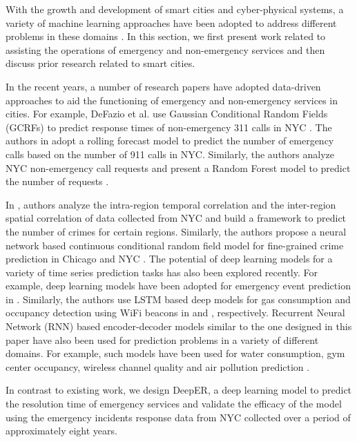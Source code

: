 
With the growth and development of smart cities and cyber-physical systems, a variety of machine learning approaches have been adopted to address different problems in these domains \cite{Fox, 6894591, AROMA, Guan, AAAI1816607,Varamin}. In this section, we first present work related to assisting the operations of emergency and non-emergency  services and then discuss  prior research related to smart cities.

In the recent years, a number of research papers have adopted data-driven approaches to aid the functioning of emergency and non-emergency  services in cities. For example, DeFazio et al. use Gaussian Conditional Random Fields (GCRFs)  to predict  response times of non-emergency  311 calls in NYC  \cite{DeFazio}.  The authors in \cite{ChohlasWood2015Mining9C}  adopt  a rolling forecast model to predict the number of emergency calls  based on the number of 911 calls in NYC. Similarly, the authors analyze NYC non-emergency call requests and present a Random Forest model to predict the number of requests  \cite{Zha2014ProfilingAP}.  

In \cite{Zhao}, authors analyze the intra-region temporal correlation and the inter-region spatial correlation of data collected from NYC and build a framework to predict the number of crimes for certain regions. Similarly, the authors propose a neural network based continuous conditional random field model  for fine-grained crime prediction in Chicago and NYC \cite{yi2019neural}.  The potential of deep learning models for a variety of time series prediction tasks has also been explored recently.  For example, deep learning models have been adopted for emergency event prediction in \cite{CORTEZ2018315}. Similarly, the authors use LSTM based deep models for gas consumption and occupancy detection using WiFi  beacons  in  \cite{Pathak} and \cite{Qolomany}, respectively.  Recurrent Neural Network (RNN) based encoder-decoder models similar to the one designed in this paper have also been used for prediction problems in a variety of different domains.  For example, such models have been used for water consumption,  gym center occupancy, wireless channel quality and air pollution prediction  \cite{SWaP, DeepFit, 8884240, reddy2018deep}. 


 In contrast to existing work, we design DeepER, a deep learning model  to predict the resolution time of emergency services and validate the efficacy of the model using the emergency incidents response data from NYC collected over a period of approximately eight years.

